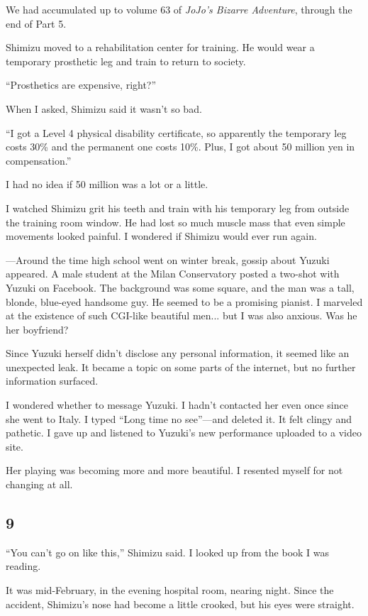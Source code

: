 \documentclass[
    a4paper,
    12pt,
    twoside,
    openany,
    UTF8,
    fontset=windows
]{ctexbook}
\begin{document}
We had accumulated up to volume 63 of \textit{JoJo's Bizarre Adventure}, through the end of Part 5.

Shimizu moved to a rehabilitation center for training. He would wear a temporary prosthetic leg and train to return to society.

``Prosthetics are expensive, right?''

When I asked, Shimizu said it wasn't so bad.

``I got a Level 4 physical disability certificate, so apparently the temporary leg costs 30\% and the permanent one costs 10\%. Plus, I got about 50 million yen in compensation.''

I had no idea if 50 million was a lot or a little.

I watched Shimizu grit his teeth and train with his temporary leg from outside the training room window. He had lost so much muscle mass that even simple movements looked painful. I wondered if Shimizu would ever run again.

---Around the time high school went on winter break, gossip about Yuzuki appeared. A male student at the Milan Conservatory posted a two-shot with Yuzuki on Facebook. The background was some square, and the man was a tall, blonde, blue-eyed handsome guy. He seemed to be a promising pianist. I marveled at the existence of such CGI-like beautiful men... but I was also anxious. Was he her boyfriend?

Since Yuzuki herself didn't disclose any personal information, it seemed like an unexpected leak. It became a topic on some parts of the internet, but no further information surfaced.

I wondered whether to message Yuzuki. I hadn't contacted her even once since she went to Italy. I typed ``Long time no see''---and deleted it. It felt clingy and pathetic. I gave up and listened to Yuzuki's new performance uploaded to a video site.

Her playing was becoming more and more beautiful. I resented myself for not changing at all.


\subsection*{9}

``You can't go on like this,'' Shimizu said. I looked up from the book I was reading.

It was mid-February, in the evening hospital room, nearing night. Since the accident, Shimizu's nose had become a little crooked, but his eyes were straight.
\end{document}
